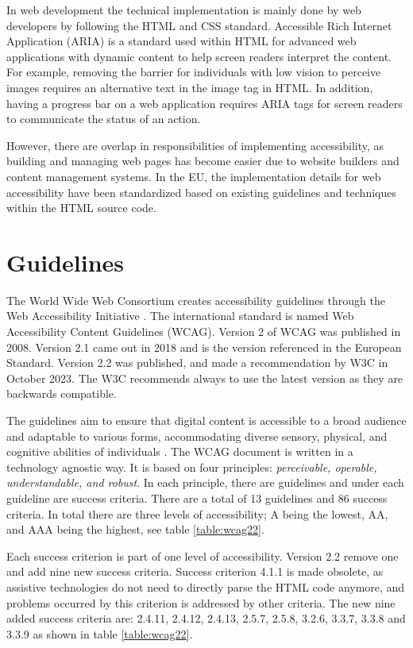 In web development the technical implementation is mainly done by web developers by following the HTML and CSS standard. Accessible Rich Internet Application (ARIA) is a standard used within HTML for advanced web applications with dynamic content to help screen readers interpret the content. For example, removing the barrier for individuals with low vision to perceive images requires an alternative text in the image tag in HTML. In addition, having a progress bar on a web application requires ARIA tags for screen readers to communicate the status of an action.

However, there are overlap in responsibilities of implementing accessibility, as building and managing web pages has become easier due to website builders and content management systems. In the EU, the implementation details for web accessibility have been standardized based on existing guidelines and techniques within the HTML source code.

\section{Guidelines}

The World Wide Web Consortium creates accessibility guidelines through the Web Accessibility Initiative \citep{wcagoverview}. The international standard is named Web Accessibility Content Guidelines (WCAG). Version 2 of WCAG was published in 2008. Version 2.1 came out in 2018 and is the version referenced in the European Standard. Version 2.2 was published, and made a recommendation by W3C in October 2023. The W3C recommends always to use the latest version as they are backwards compatible. 

The guidelines aim to ensure that digital content is accessible to a broad audience and adaptable to various forms, accommodating diverse sensory, physical, and cognitive abilities of individuals \citep{wcag22}. The WCAG document is written in a technology agnostic way. It is based on four principles: \textit{perceivable, operable, understandable, and robust}. In each principle, there are guidelines and under each guideline are success criteria. There are a total of 13 guidelines and 86 success criteria. In total there are three levels of accessibility; A being the lowest, AA, and AAA being the highest, see table \ref{table:wcag22}. 

Each success criterion is part of one level of accessibility. Version 2.2 remove one and add nine new success criteria. Success criterion 4.1.1 is made obsolete, as assistive technologies do not need to directly parse the HTML code anymore, and problems occurred by this criterion is addressed by other criteria. The new nine added success criteria are: 2.4.11, 2.4.12, 2.4.13, 2.5.7, 2.5.8, 3.2.6, 3.3.7, 3.3.8 and 3.3.9 as shown in table \ref{table:wcag22}. 

